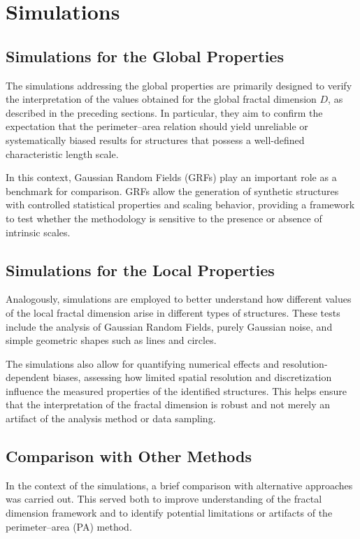 \section{Simulations}

\subsection{Simulations for the Global Properties}

The simulations addressing the global properties are primarily designed to verify the interpretation of the values obtained for the global fractal dimension $D$, as described in the preceding sections. In particular, they aim to confirm the expectation that the perimeter–area relation should yield unreliable or systematically biased results for structures that possess a well-defined characteristic length scale. 

In this context, Gaussian Random Fields (GRFs) play an important role as a benchmark for comparison. GRFs allow the generation of synthetic structures with controlled statistical properties and scaling behavior, providing a framework to test whether the methodology is sensitive to the presence or absence of intrinsic scales.

\subsection{Simulations for the Local Properties}

Analogously, simulations are employed to better understand how different values of the local fractal dimension arise in different types of structures. These tests include the analysis of Gaussian Random Fields, purely Gaussian noise, and simple geometric shapes such as lines and circles. 

The simulations also allow for quantifying numerical effects and resolution-dependent biases, assessing how limited spatial resolution and discretization influence the measured properties of the identified structures. This helps ensure that the interpretation of the fractal dimension is robust and not merely an artifact of the analysis method or data sampling.

\subsection{Comparison with Other Methods}

In the context of the simulations, a brief comparison with alternative approaches was carried out. This served both to improve understanding of the fractal dimension framework and to identify potential limitations or artifacts of the perimeter–area (PA) method.

